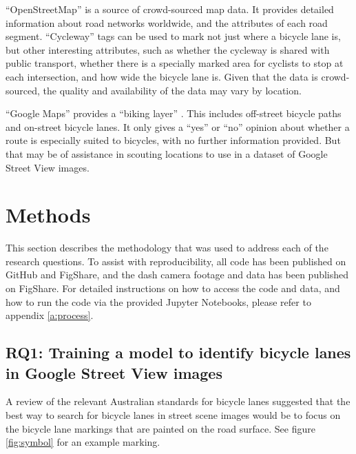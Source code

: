 \documentclass[11pt,twoside]{report}
\begin{document}
``OpenStreetMap'' \cite{OPENSTREETMAP} is a source of crowd-sourced map data.  It provides detailed information about road networks worldwide, and the attributes of each road segment.  ``Cycleway'' tags can be used to mark not just where a bicycle lane is, but other interesting attributes, such as whether the cycleway is shared with public transport, whether there is a specially marked area for cyclists to stop at each intersection, and how wide the bicycle lane is.  Given that the data is crowd-sourced, the quality and availability of the data may vary by location.

``Google Maps'' provides a ``biking layer'' \cite{bike_layer}.  This includes off-street bicycle paths and on-street bicycle lanes.  It only gives a ``yes'' or ``no'' opinion about whether a route is especially suited to bicycles, with no further information provided.  But that may be of assistance in scouting locations to use in a dataset of Google Street View images.


\chapter{Methods}


This section describes the methodology that was used to address each of the research questions.  To assist with reproducibility, all code has been published on GitHub and FigShare, and the dash camera footage and data has been published on FigShare.  For detailed instructions on how to access the code and data, and how to run the code via the provided Jupyter Notebooks, please refer to appendix \ref{a:process}.


\section{RQ1: Training a model to identify bicycle lanes in Google Street View images}
\label{s:rq1}

A review of the relevant Australian standards for bicycle lanes \cite{standards} suggested that the best way to search for bicycle lanes in street scene images would be to focus on the bicycle lane markings that are painted on the road surface.  See figure \ref{fig:symbol} for an example marking.  
\end{document}
